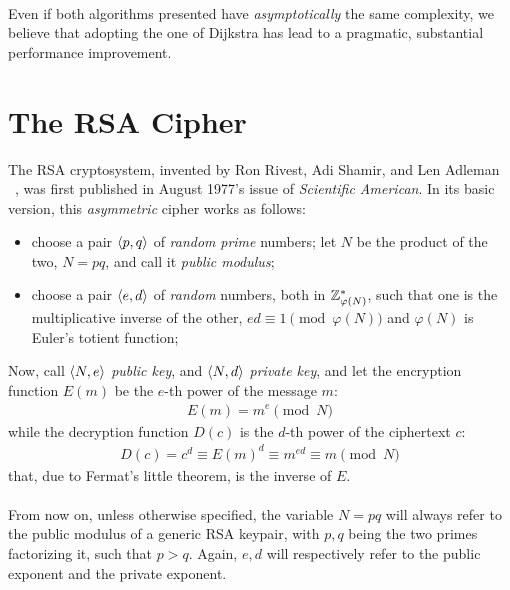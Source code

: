 \paragraph{}
Even if both algorithms presented have \emph{asymptotically} the same
complexity, we believe that adopting the one of Dijkstra has lead to a
pragmatic, substantial performance improvement.


\section{The RSA Cipher \label{sec:preq:rsa}}

The RSA cryptosystem, invented by Ron Rivest, Adi Shamir, and Len Adleman
~\cite{rsa}, was first published in August 1977's issue of
\emph{Scientific American}. In its basic version, this \emph{asymmetric} cipher
works as follows:
\begin{itemize}
  \item choose a pair $\langle p, q\rangle$ of \emph{random} \emph{prime} numbers;
    let $N$ be the product of the two, $N=pq$, and call it \emph{public modulus};
  \item choose a pair $\langle e, d\rangle$ of \emph{random} numbers, both in
    $\mathbb{Z}^*_{\varphi(N)}$, such that one is the multiplicative inverse of the
    other, $ed \equiv 1 \pmod{\varphi(N)}$ and $\varphi(N)$ is Euler's totient
    function;
\end{itemize}
Now, call $\langle N, e\rangle$ \emph{public key}, and $\langle N, d\rangle$
\emph{private key}, and let the encryption function $E(m)$ be the $e$-th power of
the message $m$:
\begin{align}
  \label{eq:rsa:encrypt}
  E(m) = m^e \pmod{N}
\end{align}
while the decryption function $D(c)$ is the $d$-th power of the ciphertext $c$:
\begin{align}
  \label{eq:rsa:decrypt}
  D(c) = c^d \equiv E(m)^d \equiv m^{ed} \equiv m \pmod{N}
\end{align}
that, due to Fermat's little theorem, is the inverse of $E$.

\paragraph{}
From now on, unless otherwise specified, the variable $N=pq$ will always refer
to the public modulus of a generic RSA keypair, with
$p, q$ being the two primes factorizing it, such that $p > q$.
 Again, $e, d$ will respectively refer to the public
exponent and the private exponent.

